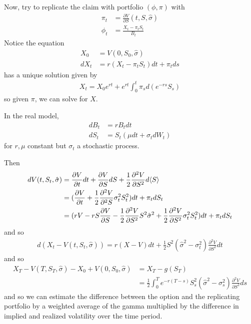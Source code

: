 Now, try to replicate the claim with portfolio $(\phi, \pi)$ with
\begin{align}
  \label{eq:95}
  \pi_{t} &= \frac{\partial V}{\partial S}(t, S, \hat \sigma) \\
  \phi_{t} &= \frac{X_{t} - \pi_{t} S_{t}}{B_{t}}
\end{align}  Notice the equation
\begin{align}
  \label{eq:96}
  X_{0} &= V(0, S_{0}, \hat \sigma) \\
  dX_{t} &= r(X_{t} - \pi_{t} S_{t}) dt + \pi_{t} ds
\end{align} has a unique solution given by
\begin{align}
  \label{eq:97}
  X_{t} = X_{0} e^{rt} + e^{rt} \int_{0}^{t} \pi_{s} d(e^{-rs} S_{s})
\end{align} so given $\pi$, we can solve for $X$.

In the real model,
\begin{align}
  \label{eq:98}
  dB_{t} &= r B_{t} dt \\
  dS_{t} &= S_{t} (\mu dt + \sigma_{t} dW_{t})
\end{align} for $r, \mu$ constant but $\sigma_{t}$ a stochastic process.

Then
\begin{align}
  \label{eq:99}
  dV(t, S_{t}, \hat \sigma) &= \frac{\partial V}{\partial t} dt +
  \frac{\partial V}{\partial S} dS + \frac{1}{2} \frac{\partial^{2}
    V}{\partial S^{2}} d \IP{S} \\
  &= (\frac{\partial V}{\partial t} + \frac{1}{2} \frac{\partial^{2}
    V}{\partial^{2} S} \sigma^{2}_{t} S_{t}^{2}) dt + \pi_{t} dS_{t}
\\
&= (rV - rS \frac{\partial V}{\partial S} - \frac{1}{2}
\frac{\partial^{2} V}{\partial S^{2}} S^{2} \hat \sigma^{2} +
\frac{1}{2} \frac{\partial^{2} V}{\partial S^{2}} \sigma^{2}_{t}
S^{2}_{t}) dt + \pi_{t} dS_{t}
\end{align} and so
\begin{align}
  \label{eq:100}
  d(X_{t} - V(t, S_{t}, \hat \sigma)) = r (X - V) dt + \frac{1}{2}
  S^{2} (\hat \sigma^{2} - \sigma^{2}_{t}) \frac{\partial^{2}
    V}{\partial S^{2}} dt
\end{align} and so
\begin{align}
  \label{eq:101}
  X_{T} - V(T, S_{T}, \hat \sigma) - X_{0} + V(0, S_{0}, \hat \sigma)
  &= X_{T} - g(S_{T}) \\
  &= \frac{1}{2}\int_{0}^{T} e^{-r(T-s)} S^{2}_{s}
  (\hat \sigma^{2} - \sigma_{s}^{2}) \frac{\partial^{2} V}{\partial
    S^{2}} ds
\end{align}
and so we can estimate the difference between the option and the
replicating portfolio by a weighted average of the gamma multiplied by
the difference in implied and realized volatility over the time period.

